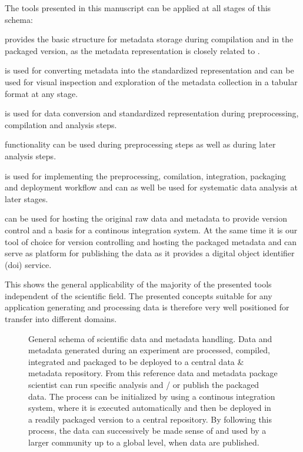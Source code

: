 The tools presented in this manuscript can be applied at all stages of this schema:
\begin{description}
 \setlength\itemsep{0pt}
 \item[\software{odML}] provides the basic structure for metadata storage during compilation and in the packaged version, as the  metadata representation is closely related to .
 \item[\software{odMLtables}] is used for converting metadata into the standardized  representation and can be used for visual inspection and exploration of the metadata collection in a tabular format at any stage.
 \item[\software{Neo}] is used for data conversion and standardized representation during preprocessing, compilation and analysis steps.
 \item[\software{Elephant}] functionality can be used during preprocessing steps as well as during later analysis steps.
 \item[\software{snakemake}] is used for implementing the preprocessing, comilation, integration, packaging and deployment workflow and can as well be used for systematic data analysis at later stages.
 \item[\software{Gin}] can be used for hosting the original raw data and metadata to provide version control and a basis for a continous integration system. At the same time it is our tool of choice for version controlling and hosting the packaged metadata and can serve as platform for publishing the data as it provides a digital object identifier (doi) service.
\end{description}

This shows the general applicability of the majority of the presented tools independent of the scientific field. The presented concepts suitable for any application generating and processing data is therefore very well positioned for transfer into different domains.


\begin{figure}
 
 \caption[General schema of scientific data and metadata handling]{General schema of scientific data and metadata handling. Data and metadata generated during an experiment are processed, compiled, integrated and packaged to be deployed to a central data \& metadata repository. From this reference data and metadata package scientist can run specific analysis and / or publish the packaged data. The process can be initialized by using a continous integration system, where it is executed automatically and then be deployed in a readily packaged version to a central repository. By following this process, the data can successively be made sense of and used by a larger community up to a global level, when data are published.}
 \label{fig:disc_general_schema}
\end{figure}



